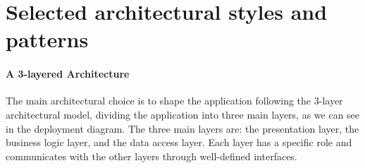 \pagebreak
\section{Selected architectural styles and patterns}
\paragraph{A 3-layered Architecture}
The main architectural choice is to shape the application following the 3-layer architectural model, dividing the application into three main layers, as we can see in the deployment diagram.
The three main layers are: the presentation layer, the business logic layer, and the data access layer. Each layer has a specific role and communicates with the other layers through well-defined interfaces.

